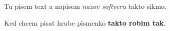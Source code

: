 \documentclass{book}
\begin{document}
Tu pisem text a napisem \emph{nazov softveru} takto sikmo.

Ked chcem pisat hrube pismenko {\bf takto robim tak}.
\end{document}
